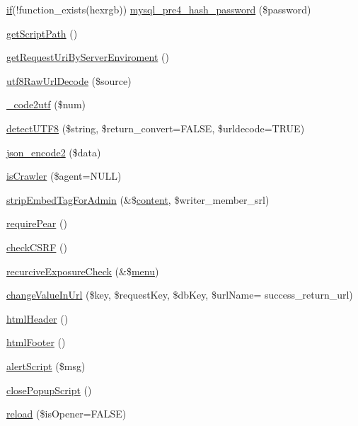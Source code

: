 \begin{DoxyCompactItemize}
\hyperlink{config_8inc_8php_ac202e21c80d0f28d495d074d3c23e1ca}{if}(!function\+\_\+exists(\textquotesingle{}hexrgb\textquotesingle{})) \hyperlink{func_8inc_8php_a8aaacd0e74786b585aaf170fe505d5f2}{mysql\+\_\+pre4\+\_\+hash\+\_\+password} (\$password)
\item 
\hyperlink{func_8inc_8php_a1086859329d03f8830d51d254c18e47e}{get\+Script\+Path} ()
\item 
\hyperlink{func_8inc_8php_a372c0e65e6e4778fc4e97b1fc3775463}{get\+Request\+Uri\+By\+Server\+Enviroment} ()
\item 
\hyperlink{func_8inc_8php_af1649820887f052ce1f1c9ca623f2db3}{utf8\+Raw\+Url\+Decode} (\$source)
\item 
\hyperlink{func_8inc_8php_a07446b33f4eda53315b12fc1c1b15f5a}{\+\_\+code2utf} (\$num)
\item 
\hyperlink{func_8inc_8php_a97f60adff3c4bbb5a341a557eef742b0}{detect\+U\+T\+F8} (\$string, \$return\+\_\+convert=F\+A\+L\+S\+E, \$urldecode=T\+R\+U\+E)
\item 
\hyperlink{func_8inc_8php_a3c49ddc63881e57fc5dd1aa4f923ef0c}{json\+\_\+encode2} (\$data)
\item 
\hyperlink{func_8inc_8php_a490ffbd4821da1995c76c381553d5b3d}{is\+Crawler} (\$agent=N\+U\+L\+L)
\item 
\hyperlink{func_8inc_8php_ad6d8ff5f851d62d39b170a46b766d834}{strip\+Embed\+Tag\+For\+Admin} (\&\$\hyperlink{classcontent}{content}, \$writer\+\_\+member\+\_\+srl)
\item 
\hyperlink{func_8inc_8php_ad09c8e07e96c499b4b71d54c2950e704}{require\+Pear} ()
\item 
\hyperlink{func_8inc_8php_a887fd7fe841f5dac3179296ae770172a}{check\+C\+S\+R\+F} ()
\item 
\hyperlink{func_8inc_8php_a229b3ea7ca966e907d266bc60efa353b}{recurcive\+Exposure\+Check} (\&\$\hyperlink{classmenu}{menu})
\item 
\hyperlink{func_8inc_8php_a2382c81f5a0708850f8790668edcaf90}{change\+Value\+In\+Url} (\$key, \$request\+Key, \$db\+Key, \$url\+Name= \textquotesingle{}success\+\_\+return\+\_\+url\textquotesingle{})
\item 
\hyperlink{func_8inc_8php_adf603cdce37b515631c58bb3acffa614}{html\+Header} ()
\item 
\hyperlink{func_8inc_8php_a2f21eda8628bd378f56529cb680006b0}{html\+Footer} ()
\item 
\hyperlink{func_8inc_8php_acc16be2ad7371ac6478f2314f1248fe2}{alert\+Script} (\$msg)
\item 
\hyperlink{func_8inc_8php_a11562ea030a5d83564d0fbfcfabc8af9}{close\+Popup\+Script} ()
\item 
\hyperlink{func_8inc_8php_aaf78eccbde1406d602a7c408a364be24}{reload} (\$is\+Opener=F\+A\+L\+S\+E)
\end{DoxyCompactItemize}
